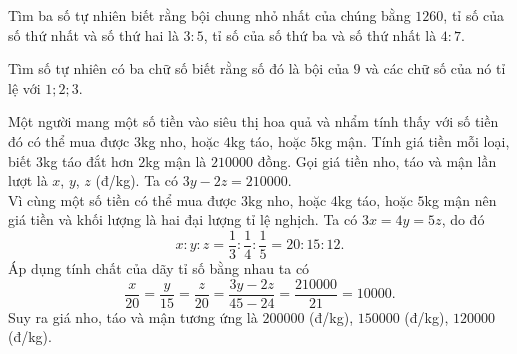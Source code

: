 \begin{vn}
Tìm ba số tự nhiên biết rằng bội chung nhỏ nhất của chúng bằng $1260$, tỉ số  của số thứ nhất và số thứ hai là $3:5$, tỉ số của số thứ ba và số thứ nhất là $4:7$.
\end{vn}
\begin{vn}
Tìm số tự nhiên có ba chữ số biết rằng số đó là bội của $9$ và các chữ số của nó tỉ lệ với $1;2;3$.
\end{vn}
\begin{vn}
Một người mang một số tiền vào siêu thị hoa quả và nhẩm tính thấy với số tiền đó có thể mua được $3$kg nho, hoặc $4$kg táo, hoặc $5$kg mận. Tính giá tiền mỗi loại, biết $3$kg táo đắt hơn $2$kg mận là $210000$ đồng.
\loigiai
{
Gọi giá tiền nho, táo và mận lần lượt là $x$, $y$, $z$ (đ/kg). Ta có $3y-2z=210000$.\\
Vì cùng một số tiền có thể mua được $3$kg nho, hoặc $4$kg táo, hoặc $5$kg mận nên giá tiền và khối lượng là hai đại lượng tỉ lệ nghịch. Ta có $3x=4y=5z$, do đó
\[x:y:z=\dfrac{1}{3}:\dfrac{1}{4}:\dfrac{1}{5}=20:15:12.\]
Áp dụng tính chất của dãy tỉ số bằng nhau ta có
\[\dfrac{x}{20}=\dfrac{y}{15}=\dfrac{z}{20}=\dfrac{3y-2z}{45-24}=\dfrac{210000}{21}=10000.\]
Suy ra giá nho, táo và mận tương ứng là $200000$ (đ/kg), $150000$ (đ/kg), $120000$ (đ/kg). 
}
\end{vn}
